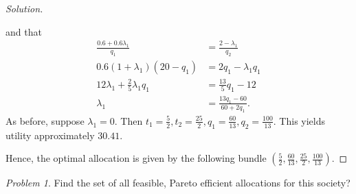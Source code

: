 \documentclass[12pt]{article}
\theoremstyle{definition}
\theoremstyle{remark}
\newtheorem{prob}{Problem}[section]
\def\la{\lambda}
\begin{document}
\begin{proof}[Solution]
\begin{enumerate}
    and that
    \begin{align*}
      \frac{0.6 + 0.6\la_1}{q_1} &= \frac{2 - \la_1}{q_2} \\
      0.6(1 + \la_1)(20 - q_1) &= 2q_1 - \la_1q_1 \\
      12\la_1 + \frac{2}{5}\la_1q_1 &= \frac{13}{5}q_1 - 12 \\
      \la_1 &= \frac{13q_1 - 60}{60 + 2q_1}.
    \end{align*}
    As before, suppose $\la_1 = 0$. Then $t_1 = \frac{5}{2}, t_2 = \frac{25}{2}, q_1 = \frac{60}{13}, q_2 = \frac{100}{13}$. This yields utility approximately $30.41$.
  \end{enumerate}
  Hence, the optimal allocation is given by the following bundle $(\frac{5}{2}, \frac{60}{13}, \frac{25}{2}, \frac{100}{13})$.
\end{proof}
\begin{prob}
  Find the set of all feasible, Pareto efficient allocations for this society?
\end{prob}
\end{document}
